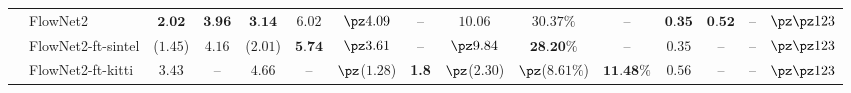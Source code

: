 {\begin{tabular}{|c|l||cc|cc||cc|ccc||cc||cc|}
        &
        FlowNet2     
        \cellcolor{gray!15}%
        & \cellcolor{gray!15}$\textbf{2.02}$ & \cellcolor{gray!15}$\textbf{3.96}$ %
        & \cellcolor{gray!15}$\textbf{3.14}$ & \cellcolor{gray!15}$6.02$ %
        & \cellcolor{gray!15}$\pz4.09$  & \cellcolor{gray!15}--  %
        & \cellcolor{gray!15}$10.06$ & \cellcolor{gray!15}$30.37\%$ & \cellcolor{gray!15}-- %
        & \cellcolor{gray!15}$\textbf{0.35}$ & \cellcolor{gray!15}$\textbf{0.52}$ %
        & \cellcolor{gray!15}-- & \cellcolor{gray!15}$\pz\pz123$%
        \\%

        &
        FlowNet2-ft-sintel  
        & ($1.45$) & $4.16$ %
        & ($2.01$) & $\textbf{5.74}$ %
        & $\pz3.61$ & -- %
        & $\pz9.84$ & $\textbf{28.20\%}$ & -- %
        & $0.35$ & -- %
        & -- & $\pz\pz123$%
        \\%

        &
        FlowNet2-ft-kitti
        & $3.43$ & -- %
        & $4.66$ & -- %
        & $\pz$($1.28$) & \textbf{1.8} %
        & $\pz$($2.30$) & $\pz$($8.61\%$) & $\textbf{11.48\%}$ %
        & $0.56$ & -- %
        & -- & $\pz\pz123$%
        \\%



        \hline 
      \end{tabular}%
    }%

